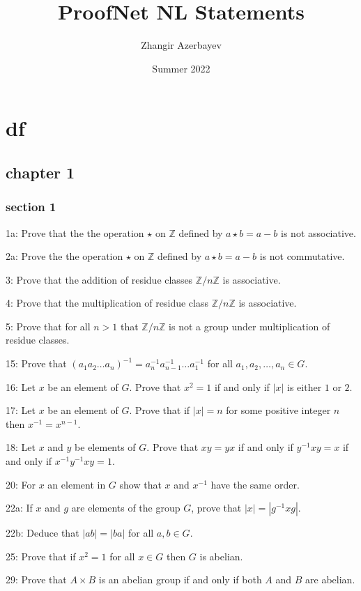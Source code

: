 \documentclass{article}
\title{ProofNet NL Statements}
\author{Zhangir Azerbayev}
\date{Summer 2022}
\begin{document}
\maketitle
\section*{df}
\subsection*{chapter 1}
\subsubsection*{section 1}
1a: Prove that the the operation $\star$ on $\mathbb{Z}$ defined by $a \star b=a-b$ is not associative. 

2a: Prove the the operation $\star$ on $\mathbb{Z}$ defined by $a\star b=a-b$ is not commutative. 

3: Prove that the addition of residue classes $\mathbb{Z}/n\mathbb{Z}$ is associative. 

4: Prove that the multiplication of residue class $\mathbb{Z}/n\mathbb{Z}$ is associative. 

5: Prove that for all $n>1$ that $\mathbb{Z}/n\mathbb{Z}$ is not a group under multiplication of residue classes. 

15: Prove that $(a_1a_2\dots a_n)^{-1} = a_n^{-1}a_{n-1}^{-1}\dots a_1^{-1}$ for all $a_1, a_2, \dots, a_n\in G$. 

16: Let $x$ be an element of $G$. Prove that $x^2=1$ if and only if $|x|$ is either $1$ or $2$. 

17: Let $x$ be an element of $G$. Prove that if $|x|=n$ for some positive integer $n$ then $x^{-1}=x^{n-1}$. 

18: Let $x$ and $y$ be elements of $G$. Prove that $xy=yx$ if and only if $y^{-1}xy=x$ if and only if $x^{-1}y^{-1}xy=1$.

20: For $x$ an element in $G$ show that $x$ and $x^{-1}$ have the same order.

22a: If $x$ and $g$ are elements of the group $G$, prove that $|x|=\left|g^{-1} x g\right|$. 

22b: Deduce that $|a b|=|b a|$ for all $a, b \in G$.

25: Prove that if $x^{2}=1$ for all $x \in G$ then $G$ is abelian.

29: Prove that $A \times B$ is an abelian group if and only if both $A$ and $B$ are abelian.
\end{document}
